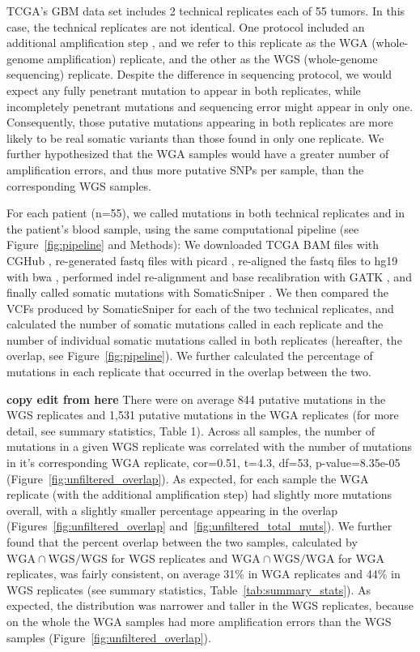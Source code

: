 \documentclass[11pt]{article} %
\begin{document}
TCGA's GBM data set includes 2 technical replicates each of 55 tumors. In this case, the technical replicates are not identical. One protocol included an additional amplification step \citep{TCGA-GBM}, and we refer to this replicate as the WGA (whole-genome amplification) replicate, and the other as the WGS (whole-genome sequencing) replicate. Despite the difference in sequencing protocol, we would expect any fully penetrant mutation to appear in both replicates, while incompletely penetrant mutations and sequencing error might appear in only one. Consequently, those putative mutations appearing in both replicates are more likely to be real somatic variants than those found in only one replicate. We further hypothesized that the WGA samples would have a greater number of amplification errors, and thus more putative SNPs per sample, than the corresponding WGS samples. 

For each patient (n=55), we called mutations in both technical replicates and in the patient's blood sample, using the same computational pipeline (see Figure~\ref{fig:pipeline} and Methods): We downloaded TCGA BAM files with CGHub \citep{CGHub}, re-generated fastq files with picard \citep{picard}, re-aligned the fastq files to hg19 with bwa \citep{bwa}, performed indel re-alignment and base recalibration with GATK \citep{GATK}, and finally called somatic mutations with SomaticSniper \citep{SomaticSniper}. We then compared the VCFs produced by SomaticSniper for each of the two technical replicates, and calculated the number of somatic mutations called in each replicate and the number of individual somatic mutations called in both replicates (hereafter, the overlap, see Figure~\ref{fig:pipeline}). We further calculated the percentage of mutations in each replicate that occurred in the overlap between the two. 

\textbf{copy edit from here}
There were on average 844 putative mutations in the WGS replicates and 1,531 putative mutations in the WGA replicates (for more detail, see summary statistics, Table 1). Across all samples, the number of mutations in a given WGS replicate was correlated with the number of mutations in it's corresponding WGA replicate, cor=0.51, t=4.3, df=53, p-value=8.35e-05 (Figure~\ref{fig:unfiltered_overlap}). As expected, for each sample the WGA replicate (with the additional amplification step) had slightly more mutations overall, with a slightly smaller percentage appearing in the overlap (Figures~\ref{fig:unfiltered_overlap} and~\ref{fig:unfiltered_total_muts}). We further found that the percent overlap between the two samples, calculated by $\text{WGA} \cap \text{WGS}/\text{WGS}$ for WGS replicates and $\text{WGA} \cap \text{WGS}/\text{WGA}$ for WGA replicates, was fairly consistent, on average 31\% in WGA replicates and 44\% in WGS replicates (see summary statistics, Table~\ref{tab:summary_stats}). As expected, the distribution was narrower and taller in the WGS replicates, because on the whole the WGA samples had more amplification errors than the WGS samples (Figure~\ref{fig:unfiltered_overlap}).
\end{document}
